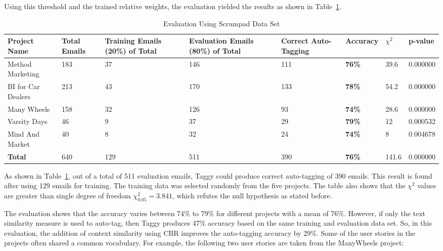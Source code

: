 Using this threshold and the trained relative weights, the evaluation yielded the results as shown in Table~\ref{tab:sp_evaluation}.

\begin{table}[h!]
  \centering
  \caption{Evaluation Using Scrumpad Data Set}
	\label{tab:sp_evaluation}
    \begin{tabular}{|p{1.7cm}|p{1.4cm}|p{2cm}|p{2cm}|p{1.7cm}|p{1.7cm}|p{1cm}|p{1.5cm}|}
      \hline
      \textbf{Project Name} & \textbf{Total Emails} & \textbf{Training Emails (20\%) of Total} & \textbf{Evaluation Emails (80\%)  of Total} & \textbf{Correct Auto-Tagging} & \textbf{Accuracy} & $\chi^{2}$ & p-value\\
      \hline
      Method Marketing & 183 		& 37	& 146	&	111 & \textbf{76\%}	& 39.6	& 0.000000\\
      \hline
      BI for Car Dealers & 213 	& 43	& 170	&	133	& \textbf{78\%}	& 54.2	& 0.000000\\
      \hline
      Many Wheels & 158 				& 32	& 126	& 93	& \textbf{74\%}	& 28.6 	& 0.000000\\
      \hline
      Varsity Days & 46 				& 9		&	37	& 29	& \textbf{79\%}	& 12		& 0.000532\\
      \hline
      Mind And Market & 40 			& 8		& 32	&	24	& \textbf{74\%}	& 8			& 0.004678\\
      \hline
      \textbf{Total} & 640 			& 129	& 511	&	390	& \textbf{76\%}	& 141.6 & 0.000000\\
      \hline
    \end{tabular}
\end{table}

As shown in Table~\ref{tab:sp_evaluation}, out of a total of 511 evaluation emails, Taggy could produce correct auto-tagging of 390 emails. This result is found after using 129 emails for training. The training data was selected randomly from the five projects. The table also shows that the $\chi^{2}$ values are greater than single degree of freedom $\chi^{2}_{0.05} = 3.841$, which refutes the null hypothesis as stated before.

The evaluation shows that the accuracy varies between 74\% to 79\% for different projects with a mean of 76\%. However, if only the text similarity measure is used to auto-tag, then Taggy produces 47\% accuracy based on the same training and evaluation data set. So, in this evaluation, the addition of context similarity using CBR improves the auto-tagging accuracy by 29\%. Some of the user stories in the projects often shared a common vocabulary. For example, the following two user stories are taken from the ManyWheels project:

